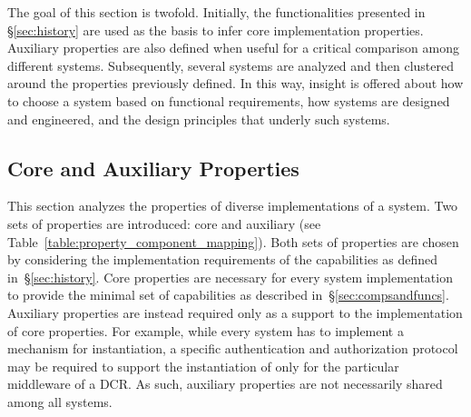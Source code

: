 \documentclass{sig-alternate}
\begin{document}

The goal of this section is twofold. Initially, the \pilot functionalities
presented in \S\ref{sec:history} are used as the basis to infer core \pilot
implementation properties. Auxiliary properties are also defined when useful
for a critical comparison among different \pilot systems. Subsequently, several
\pilot systems are analyzed and then clustered around the properties previously
defined. In this way, insight is offered about how to choose a \pilot system
based on functional requirements, how \pilot systems are designed and
engineered, and the design principles that underly such systems.


%
\subsection{Core and Auxiliary Properties}
\label{sec:properties}

This section analyzes the properties of diverse implementations of a \pilot
system. Two sets of properties are introduced: core and auxiliary (see
Table~\ref{table:property_component_mapping}). Both sets of properties are
chosen by considering the implementation requirements of the \pilot capabilities
as defined in~\S\ref{sec:history}. Core properties are necessary for every
\pilot system implementation to provide the minimal set of capabilities as
described in~\S\ref{sec:compsandfuncs}. Auxiliary properties are instead
required only as a support to the implementation of core properties. For
example, while every \pilot system has to implement a mechanism for \pilot
instantiation, a specific authentication and authorization protocol may be
required to support the instantiation of \pilots only for the particular
middleware of a DCR. As such, auxiliary properties are not necessarily shared
among all \pilot systems.


 
\end{document}

